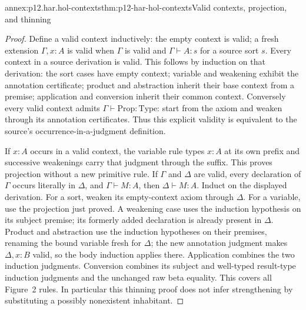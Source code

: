 \begin{annexitem}{annex:p12.har.hol-contexts}{thm:p12-har-hol-contexts}{Valid contexts, projection, and thinning}
\begin{proof}
Define a valid context inductively: the empty context is valid; a fresh
extension \(\Gamma,x:A\) is valid when \(\Gamma\) is valid and
\(\Gamma\vdash A:s\) for a source sort \(s\). Every context in a
source derivation is valid. This follows by induction on that derivation:
the sort cases have empty context; variable and weakening exhibit the
annotation certificate; product and abstraction inherit their base
context from a premise; application and conversion inherit their common
context. Conversely every valid context admits
\(\Gamma\vdash\mathrm{Prop}:\mathrm{Type}\): start from the axiom and
weaken through its annotation certificates. Thus this explicit validity
is equivalent to the source's occurrence-in-a-judgment definition.

If \(x:A\) occurs in a valid context, the variable rule types \(x:A\)
at its own prefix and successive weakenings carry that judgment through
the suffix. This proves projection without a new primitive rule.
If \(\Gamma\) and \(\Delta\) are valid, every declaration of
\(\Gamma\) occurs literally in \(\Delta\), and
\(\Gamma\vdash M:A\), then \(\Delta\vdash M:A\).
Induct on the displayed derivation. For a sort, weaken its empty-context
axiom through \(\Delta\). For a variable, use the projection just proved.
A weakening case uses the induction hypothesis on its subject premise;
its formerly added declaration is already present in \(\Delta\).
Product and abstraction use the induction hypotheses on their premises,
renaming the bound variable fresh for \(\Delta\); the new annotation
judgment makes \(\Delta,x:B\) valid, so the body induction applies
there. Application combines the two induction judgments. Conversion
combines its subject and well-typed result-type induction judgments and
the unchanged raw beta equality. This covers all Figure~2 rules.
In particular this thinning proof does not infer strengthening by
substituting a possibly nonexistent inhabitant.
\end{proof}
\end{annexitem}

